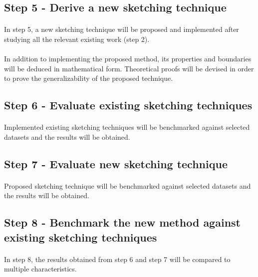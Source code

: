 \subsection*{Step 5 - Derive a new sketching technique}

\paragraph{}
In step 5, a new sketching technique will be proposed and implemented after studying all the relevant existing work (step 2).

\paragraph{}
In addition to implementing the proposed method, its properties and boundaries will be deduced in mathematical form. Theoretical proofs will be devised in order to prove the generalizability of the proposed technique.

\subsection*{Step 6 - Evaluate existing sketching techniques}

\paragraph{}
Implemented existing sketching techniques will be benchmarked against selected datasets and the results will be obtained.

\subsection*{Step 7 - Evaluate new sketching technique}

\paragraph{}
Proposed sketching technique will be benchmarked against selected datasets and the results will be obtained.

\subsection*{Step 8 - Benchmark the new method against existing sketching techniques}

\paragraph{}
In step 8, the results obtained from step 6 and step 7 will be compared to multiple characteristics.

